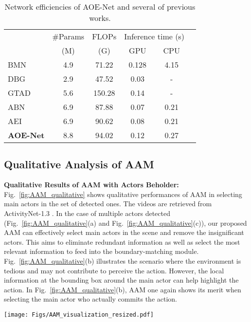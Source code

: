 \documentclass[sn-mathphys]{sn-jnl}
\theoremstyle{thmstyleone}\newtheorem{theorem}{Theorem}\newtheorem{proposition}[theorem]{Proposition}
\theoremstyle{thmstyletwo}\newtheorem{example}{Example}\newtheorem{remark}{Remark}
\theoremstyle{thmstylethree}\newtheorem{definition}{Definition}
\begin{document}
\begin{table}[!t]
\centering
\begin{tabular}{l|ccccc}
      & \#Params& FLOPs & \multicolumn{2}{c}{Inference time (s)} \\ 
      & (M) & (G) & GPU & CPU\\ 
      \hline \hline
BMN~\cite{bmn} & 4.9 & 71.22 & 0.128 & 4.15 \\ DBG~\cite{dbg} & 2.9 & 47.52 & 0.03 & - \\ GTAD~\cite{xu2020gtad} & 5.6 & 150.28 & 0.14 & - \\ ABN~\cite{KhoaVo_Access} & 6.9 & 87.88 & 0.07 & 0.21\\ AEI~\cite{khoavo_aei_bmvc21} & 6.9 & 90.62 & 0.08 & 0.21 \\ \hline
      \textbf{AOE-Net} & 8.8 & 94.02 & 0.12 & 0.27 \\ \bottomrule
\end{tabular}
\caption{Network efficiencies of AOE-Net and several of previous works.} \label{tb:abl_4}
\end{table}



\subsection{Qualitative Analysis of AAM}

\noindent\textbf{Qualitative Results of AAM with Actors Beholder:}\\
Fig.~\ref{fig:AAM_qualitative} shows qualitative performances of AAM in selecting main actors in the set of detected ones. The videos are retrieved from ActivityNet-1.3 \cite{caba2015activitynet}. 
In the case of multiple actors detected (Fig.~\ref{fig:AAM_qualitative}(a) and Fig.~\ref{fig:AAM_qualitative}(c)), our proposed AAM can effectively select main actors in the scene and remove the insignificant actors. This aims to eliminate redundant information as well as select the most relevant information to feed into the boundary-matching module. Fig.~\ref{fig:AAM_qualitative}(b) illustrates the scenario where the environment is tedious and may not contribute to perceive the action. However, the local information at the bounding box around the main actor can help highlight the action. In Fig.~\ref{fig:AAM_qualitative}(b), AAM one again shows its merit when selecting the main actor who actually commits the action.

\begin{figure*}[!ht]
    \centering
    \texttt{[image: Figs/AAM\_visualization\_resized.pdf]}
    \caption{Visualization of main actors selection resulting by AAM on ActivityNet-1.3 \cite{caba2015activitynet}. (a), (b), and (c) are three different videos. The background is blacked out, the bounding boxes of main actors are outlined by green line and the bounding boxes of insignificant actors are outlined by grey line.}
    \label{fig:AAM_qualitative}
\end{figure*}
\end{document}
